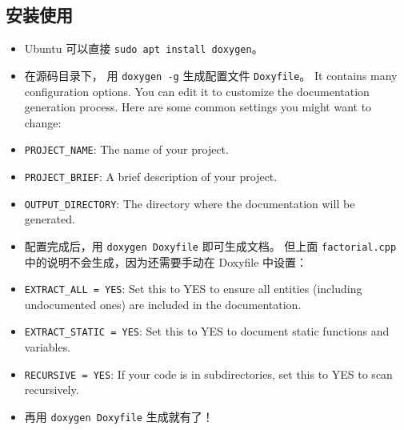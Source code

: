 \subsection{安装使用}
\begin{itemize}
\item Ubuntu 可以直接 \verb`sudo apt install doxygen`。
\item 在源码目录下， 用 \verb`doxygen -g` 生成配置文件 \verb`Doxyfile`。 It contains many configuration options. You can edit it to customize the documentation generation process. Here are some common settings you might want to change:
\item \verb`PROJECT_NAME`: The name of your project.
\item \verb`PROJECT_BRIEF`: A brief description of your project.
\item \verb`OUTPUT_DIRECTORY`: The directory where the documentation will be generated.
\item 配置完成后，用 \verb`doxygen Doxyfile` 即可生成文档。 但上面 \verb`factorial.cpp` 中的说明不会生成，因为还需要手动在 Doxyfile 中设置：
\item \verb`EXTRACT_ALL = YES`: Set this to YES to ensure all entities (including undocumented ones) are included in the documentation.
\item \verb`EXTRACT_STATIC = YES`: Set this to YES to document static functions and variables.
\item \verb`RECURSIVE = YES`: If your code is in subdirectories, set this to YES to scan recursively.
\item 再用 \verb`doxygen Doxyfile` 生成就有了！
\end{itemize}

